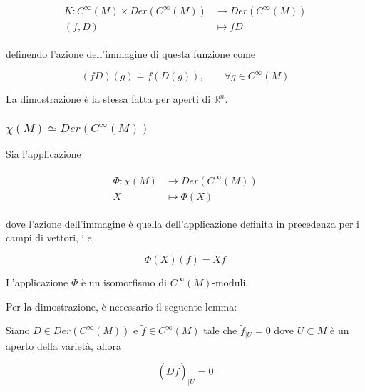 \begin{align}
	\begin{split}
		K : C^{\infty}(M) \times Der(C^{\infty}(M)) &\to Der(C^{\infty}(M))\\
		(f,D) &\mapsto f D
	\end{split}
\end{align}

definendo l'azione dell'immagine di questa funzione come

\begin{equation}
	(f D)(g) \doteq f (D(g)), \qquad \forall g \in C^{\infty}(M)
\end{equation}

La dimostrazione è la stessa fatta per aperti di $ \mathbb{R}^{n} $.

\subsubsection{$ \chi(M) \simeq Der(C^{\infty}(M)) $}

\begin{theorem}
	Sia l'applicazione
	
	\begin{align}
		\begin{split}
			\Phi : \chi(M) &\to Der(C^{\infty}(M))\\
			X &\mapsto \Phi(X)
		\end{split}
	\end{align}

	dove l'azione dell'immagine è quella dell'applicazione definita in precedenza per i campi di vettori, i.e.
	
	\begin{equation}
		\Phi(X)(f) = X f
	\end{equation}

	L'applicazione $ \Phi $ è un isomorfismo di $ C^{\infty}(M) $-moduli.
\end{theorem}

Per la dimostrazione, è necessario il seguente lemma:

\begin{lemma}
	Siano $ D \in Der(C^{\infty}(M)) $ e $ \tilde{f} \in C^{\infty}(M) $ tale che $ \tilde{f}_{|U} = 0 $ dove $ U \subset M $ è un aperto della varietà, allora
	
	\begin{equation}
		(D \tilde{f})_{|U} = 0
	\end{equation}
\end{lemma}


